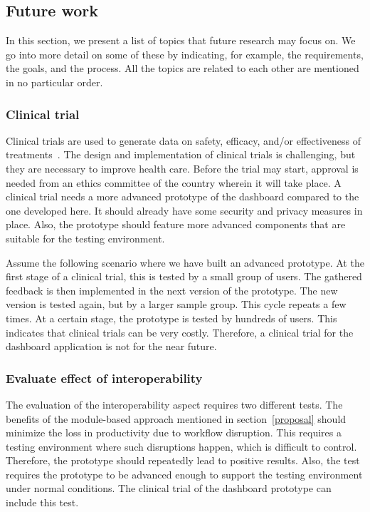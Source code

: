     \subsection{Future work}\label{future_work}

    In this section, we present a list of topics that future research may focus on. We go into more detail on some of these by indicating, for example, the requirements, the goals, and the process. All the topics are related to each other are mentioned in no particular order.

    \subsubsection{Clinical trial}

    Clinical trials are used to generate data on safety, efficacy, and/or effectiveness of treatments~\cite{Minneci2018}. The design and implementation of clinical trials is challenging, but they are necessary to improve health care. Before the trial may start, approval is needed from an ethics committee of the country wherein it will take place. A clinical trial needs a more advanced prototype of the dashboard compared to the one developed here. It should already have some security and privacy measures in place. Also, the prototype should feature more advanced components that are suitable for the testing environment.

    Assume the following scenario where we have built an advanced prototype. At the first stage of a clinical trial, this is tested by a small group of users. The gathered feedback is then implemented in the next version of the prototype. The new version is tested again, but by a larger sample group. This cycle repeats a few times. At a certain stage, the prototype is tested by hundreds of users. This indicates that clinical trials can be very costly. Therefore, a clinical trial for the dashboard application is not for the near future.

    \subsubsection{Evaluate effect of interoperability}

    The evaluation of the interoperability aspect requires two different tests. The benefits of the module-based approach mentioned in section~\ref{proposal} should minimize the loss in productivity due to workflow disruption. This requires a testing environment where such disruptions happen, which is difficult to control. Therefore, the prototype should repeatedly lead to positive results. Also, the test requires the prototype to be advanced enough to support the testing environment under normal conditions. The clinical trial of the dashboard prototype can include this test.

